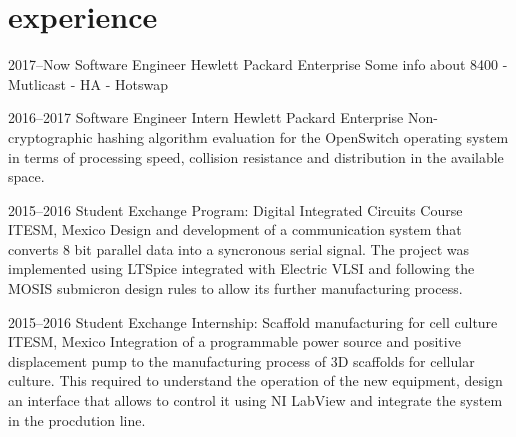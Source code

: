 \documentclass[]{friggeri-cv} %
\begin{document}

\section{experience}


\begin{entrylist}


\entry
{2017--Now}
{Software Engineer}
{Hewlett Packard Enterprise}
{Some info about 8400 - Mutlicast - HA - Hotswap} 

\entry
{2016--2017}
{Software Engineer Intern}
{Hewlett Packard Enterprise}
{Non-cryptographic hashing algorithm evaluation for the OpenSwitch operating
system in terms of processing speed, collision resistance and distribution in the
available space.} 

\entry
{2015--2016}
{Student Exchange Program: Digital Integrated Circuits Course}
{ITESM, Mexico}
{Design and development of a communication system that converts 8 bit parallel
data into a syncronous serial signal. The project was implemented using
LTSpice integrated with Electric VLSI and following the MOSIS submicron design
rules to allow its further manufacturing process.} 

\entry
{2015--2016}
{Student Exchange Internship: Scaffold manufacturing for cell culture}
{ITESM, Mexico}
{Integration of a programmable power source and positive displacement pump
to the manufacturing process of 3D scaffolds for cellular culture. This required to
understand the operation of the new equipment, design an interface that allows
to control it using NI LabView and integrate the system in the procdution line.} 


\end{entrylist}
\end{document}
